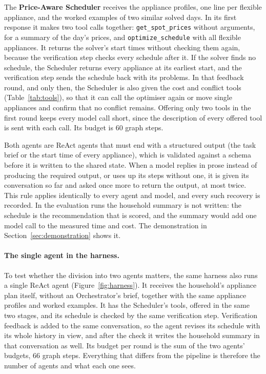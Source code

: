 \documentclass[12pt,a4paper]{report}
\begin{document}
The \textbf{Price-Aware Scheduler} receives the appliance profiles, one
line per flexible appliance, and the worked examples of two similar
solved days. In its first response it makes two tool calls together:
\texttt{get\_spot\_prices} without arguments, for a summary of the
day's prices, and \texttt{optimize\_schedule} with all flexible
appliances. It returns the solver's start times without checking them
again, because the verification step checks every schedule after it. If
the solver finds no schedule, the Scheduler returns every appliance at
its earliest start, and the verification step sends the schedule back
with its problems. In that feedback round, and only then, the Scheduler
is also given the cost and conflict tools (Table~\ref{tab:tools}), so
that it can call the optimiser again or move single appliances and
confirm that no conflict remains. Offering only two tools in the first
round keeps every model call short, since the description of every
offered tool is sent with each call. Its budget is 60 graph steps.

Both agents are ReAct agents that must end with a structured output
(the task brief or the start time of every appliance), which is
validated against a schema before it is written to the shared state.
When a model replies in prose instead of producing the required output,
or uses up its steps without one, it is given its conversation so far
and asked once more to return the output, at most twice. This rule
applies identically to every agent and model, and every such recovery
is recorded. In the evaluation runs the household summary is not
written: the schedule is the recommendation that is scored, and the
summary would add one model call to the measured time and cost. The
demonstration in Section~\ref{sec:demonstration} shows it.

\paragraph{The single agent in the harness.} To test whether the
division into two agents matters, the same harness also runs a single
ReAct agent (Figure~\ref{fig:harness}). It receives the household's
appliance plan itself, without an Orchestrator's brief, together with
the same appliance profiles and worked examples. It has the
Scheduler's tools, offered in the same two stages, and its schedule is
checked by the same verification step. Verification feedback is added
to the same conversation, so the agent revises its schedule with its
whole history in view, and after the check it writes the household
summary in that conversation as well. Its budget per round is the sum
of the two agents' budgets, 66 graph steps. Everything that differs
from the pipeline is therefore the number of agents and what each one
sees.
\end{document}
